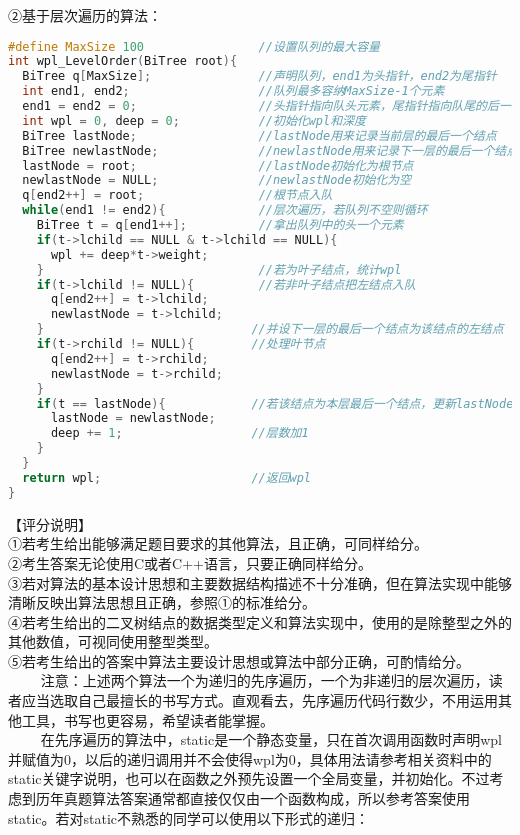 ②基于层次遍历的算法：
\begin{lstlisting}[language=cpp]
#define MaxSize 100                //设置队列的最大容量
int wpl_LevelOrder(BiTree root){
  BiTree q[MaxSize];               //声明队列，end1为头指针，end2为尾指针
  int end1, end2;                  //队列最多容纳MaxSize-1个元素
  end1 = end2 = 0;                 //头指针指向队头元素，尾指针指向队尾的后一个元素
  int wpl = 0, deep = 0;           //初始化wpl和深度
  BiTree lastNode;                 //lastNode用来记录当前层的最后一个结点
  BiTree newlastNode;              //newlastNode用来记录下一层的最后一个结点
  lastNode = root;                 //lastNode初始化为根节点
  newlastNode = NULL;              //newlastNode初始化为空
  q[end2++] = root;                //根节点入队
  while(end1 != end2){             //层次遍历，若队列不空则循环
    BiTree t = q[end1++];          //拿出队列中的头一个元素
    if(t->lchild == NULL & t->lchild == NULL){
      wpl += deep*t->weight;
    }                              //若为叶子结点，统计wpl
    if(t->lchild != NULL){         //若非叶子结点把左结点入队
      q[end2++] = t->lchild;
      newlastNode = t->lchild;
    }                             //并设下一层的最后一个结点为该结点的左结点
    if(t->rchild != NULL){        //处理叶节点
      q[end2++] = t->rchild;
      newlastNode = t->rchild;
    }
    if(t == lastNode){            //若该结点为本层最后一个结点，更新lastNode
      lastNode = newlastNode;
      deep += 1;                  //层数加1
    }
  }
  return wpl;                     //返回wpl
}
\end{lstlisting}
【评分说明】 \\
①若考生给出能够满足题目要求的其他算法，且正确，可同样给分。 \\
②考生答案无论使用C或者C++语言，只要正确同样给分。 \\
③若对算法的基本设计思想和主要数据结构描述不十分准确，但在算法实现中能够清晰反映出算法思想且正确，参照①的标准给分。 \\
④若考生给出的二叉树结点的数据类型定义和算法实现中，使用的是除整型之外的其他数值，可视同使用整型类型。 \\
⑤若考生给出的答案中算法主要设计思想或算法中部分正确，可酌情给分。 \\
$\qquad$ 注意：上述两个算法一个为递归的先序遍历，一个为非递归的层次遍历，读者应当选取自己最擅长的书写方式。直观看去，先序遍历代码行数少，不用运用其他工具，书写也更容易，希望读者能掌握。 \\
$\qquad$ 在先序遍历的算法中，static是一个静态变量，只在首次调用函数时声明wpl并赋值为0，以后的递归调用并不会使得wpl为0，具体用法请参考相关资料中的static关键字说明，也可以在函数之外预先设置一个全局变量，并初始化。不过考虑到历年真题算法答案通常都直接仅仅由一个函数构成，所以参考答案使用static。若对static不熟悉的同学可以使用以下形式的递归：

